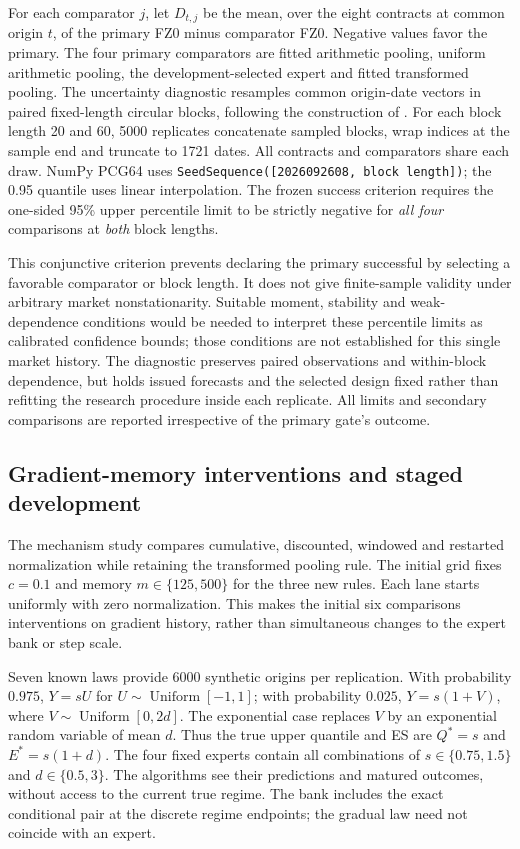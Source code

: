 \documentclass[11pt,a4paper]{article}
\theoremstyle{definition}\newtheorem{definition}[theorem]{Definition}
\begin{document}
For each comparator $j$, let $D_{t,j}$ be the mean, over the eight contracts at common origin $t$, of the primary FZ0 minus comparator FZ0. Negative values favor the primary. The four primary comparators are fitted arithmetic pooling, uniform arithmetic pooling, the development-selected expert and fitted transformed pooling. The uncertainty diagnostic resamples common origin-date vectors in paired fixed-length circular blocks, following the construction of \citet{politis1991circular}. For each block length 20 and 60, 5000 replicates concatenate sampled blocks, wrap indices at the sample end and truncate to 1721 dates. All contracts and comparators share each draw. NumPy PCG64 uses \texttt{SeedSequence([2026092608, block length])}; the 0.95 quantile uses linear interpolation. The frozen success criterion requires the one-sided 95\% upper percentile limit to be strictly negative for \emph{all four} comparisons at \emph{both} block lengths.

This conjunctive criterion prevents declaring the primary successful by selecting a favorable comparator or block length. It does not give finite-sample validity under arbitrary market nonstationarity. Suitable moment, stability and weak-dependence conditions would be needed to interpret these percentile limits as calibrated confidence bounds; those conditions are not established for this single market history. The diagnostic preserves paired observations and within-block dependence, but holds issued forecasts and the selected design fixed rather than refitting the research procedure inside each replicate. All limits and secondary comparisons are reported irrespective of the primary gate's outcome.

\subsection{Gradient-memory interventions and staged development}\label{sec:forgetprotocol}
The mechanism study compares cumulative, discounted, windowed and restarted normalization while retaining the transformed pooling rule. The initial grid fixes $c=0.1$ and memory $m\in\{125,500\}$ for the three new rules. Each lane starts uniformly with zero normalization. This makes the initial six comparisons interventions on gradient history, rather than simultaneous changes to the expert bank or step scale.

Seven known laws provide 6000 synthetic origins per replication. With probability $0.975$, $Y=sU$ for $U\sim\operatorname{Uniform}[-1,1]$; with probability $0.025$, $Y=s(1+V)$, where $V\sim\operatorname{Uniform}[0,2d]$. The exponential case replaces $V$ by an exponential random variable of mean $d$. Thus the true upper quantile and ES are $Q^*=s$ and $E^*=s(1+d)$. The four fixed experts contain all combinations of $s\in\{0.75,1.5\}$ and $d\in\{0.5,3\}$. The algorithms see their predictions and matured outcomes, without access to the current true regime. The bank includes the exact conditional pair at the discrete regime endpoints; the gradual law need not coincide with an expert.
\end{document}
